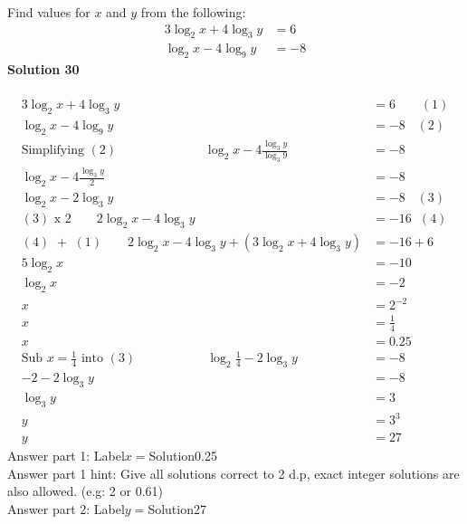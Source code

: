 \documentclass{article}
\begin{document}
Find values for $x$ and $y$ from the following:
\begin{align*}
3\log_{2}x+4\log_{3}y&=6\\[2pt]
\log_{2}x-4\log_{9}y&=-8
\end{align*}
\noindent\textbf{Solution 30}\\[2pt]
\\[-35pt]\begin{align*}
3\log_{2}x+4\log_{3}y&=6\qquad (1)\\[2pt]
\log_{2}x-4\log_{9}y&=-8\hspace{11pt}(2)\\[2pt]
\text{Simplifying}\,\,(2)\hspace{83pt}\log_{2}x-4\displaystyle\frac{\log_{3}y}{\log_{3}9}&=-8\\[2pt]
\log_{2}x-4\displaystyle\frac{\log_{3}y}{2}&=-8\\[2pt]
\log_{2}x-2\log_{3}y&=-8\hspace{11pt}(3)\\[2pt]
(3)\,\,\text{x}\,\,2\qquad 2\log_{2}x-4\log_{3}y&=-16\hspace{7pt}(4)\\[2pt]
(4)\,\,+\,\,(1)\qquad 2\log_{2}x-4\log_{3}y+(3\log_{2}x+4\log_{3}y)&=-16+6\\[2pt]
5\log_{2}x&=-10\\[2pt]
\log_{2}x&=-2\\[2pt]
x&=2^{-2}\\[2pt]
x&=\displaystyle\frac{1}{4}\\[2pt]
x&=0.25\\[12pt]
\text{Sub}\,\, x=\displaystyle\frac{1}{4}\,\,\text{into}\,\,(3)\hspace{67pt} \log_{2}\displaystyle\frac{1}{4}-2\log_{3}y&=-8\\[2pt]
-2-2\log_{3}y&=-8\\[2pt]
\log_{3}y&=3\\[2pt]
y&=3^3\\[2pt]
y&=27
\end{align*}
Answer part 1: \hspace{10pt}Label\hspace{10pt}$x=$\hspace{10pt}Solution\hspace{10pt}0.25\\
Answer part 1 hint: \hspace{15pt}Give all solutions correct to 2 d.p, exact integer solutions are also allowed. (e.g: 2 or 0.61)\\
Answer part 2: \hspace{10pt}Label\hspace{10pt}$y=$\hspace{10pt}Solution\hspace{10pt}27\\
\end{document}
